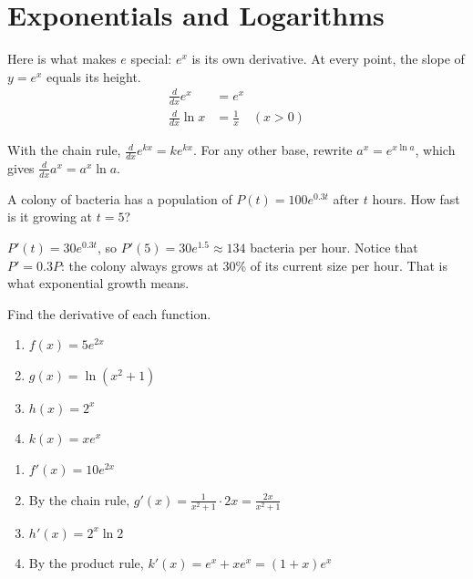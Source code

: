 \section{Exponentials and Logarithms}

Here is what makes $e$ special: $e^x$ is its own derivative. At every
point, the slope of $y = e^x$ equals its height.
\begin{align}
\frac{d}{dx}e^x &= e^x\\
\frac{d}{dx}\ln{x} &= \frac{1}{x} \quad (x > 0)
\end{align}

With the chain rule, $\frac{d}{dx}e^{kx} = ke^{kx}$. For any other base,
rewrite $a^x = e^{x\ln{a}}$, which gives $\frac{d}{dx}a^x = a^x\ln{a}$.

\begin{Worked}
\begin{Problem}
A colony of bacteria has a population of $P(t) = 100e^{0.3t}$
after $t$ hours. How fast is it growing at $t = 5$?
\end{Problem}
\begin{Solution}
$P'(t) = 30e^{0.3t}$, so $P'(5) = 30e^{1.5} \approx 134$
bacteria per hour. Notice that $P' = 0.3P$: the colony always grows at
30\% of its current size per hour. That is what exponential growth means.
\end{Solution}
\end{Worked}

\begin{Exercise}[title={Exponential Derivatives}, label=deriv_explog]
Find the derivative of each function.
\begin{enumerate}
\item $f(x) = 5e^{2x}$
\item $g(x) = \ln{(x^2 + 1)}$
\item $h(x) = 2^x$
\item $k(x) = xe^{x}$
\end{enumerate}
\end{Exercise}
\begin{Answer}[ref=deriv_explog]
\begin{enumerate}
\item $f'(x) = 10e^{2x}$
\item By the chain rule, $g'(x) = \frac{1}{x^2 + 1} \cdot 2x = \frac{2x}{x^2 + 1}$
\item $h'(x) = 2^x\ln{2}$
\item By the product rule, $k'(x) = e^x + xe^x = (1 + x)e^x$
\end{enumerate}
\end{Answer}

